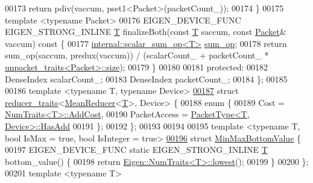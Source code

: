 \begin{DoxyCode}
00173     \textcolor{keywordflow}{return} pdiv(vaccum, pset1<Packet>(packetCount\_));
00174   \}
00175   \textcolor{keyword}{template} <\textcolor{keyword}{typename} Packet>
00176   EIGEN\_DEVICE\_FUNC EIGEN\_STRONG\_INLINE \hyperlink{group___sparse_core___module}{T} finalizeBoth(\textcolor{keyword}{const} \hyperlink{group___sparse_core___module}{T} saccum, \textcolor{keyword}{const} 
      \hyperlink{union_eigen_1_1internal_1_1_packet}{Packet}& vaccum)\textcolor{keyword}{ const }\{
00177     \hyperlink{struct_eigen_1_1internal_1_1scalar__sum__op}{internal::scalar\_sum\_op<T>} \hyperlink{struct_eigen_1_1internal_1_1sum__op}{sum\_op};
00178     \textcolor{keywordflow}{return} sum\_op(saccum, predux(vaccum)) / (scalarCount\_ + packetCount\_ * 
      \hyperlink{struct_eigen_1_1internal_1_1unpacket__traits}{unpacket\_traits<Packet>::size});
00179   \}
00180 
00181   \textcolor{keyword}{protected}:
00182     DenseIndex scalarCount\_;
00183     DenseIndex packetCount\_;
00184 \};
00185 
00186 \textcolor{keyword}{template} <\textcolor{keyword}{typename} T, \textcolor{keyword}{typename} Device>
\hyperlink{struct_eigen_1_1internal_1_1reducer__traits_3_01_mean_reducer_3_01_t_01_4_00_01_device_01_4}{00187} \textcolor{keyword}{struct }\hyperlink{struct_eigen_1_1internal_1_1reducer__traits}{reducer\_traits}<\hyperlink{struct_eigen_1_1internal_1_1_mean_reducer}{MeanReducer}<\hyperlink{group___sparse_core___module}{T}>, Device> \{
00188   \textcolor{keyword}{enum} \{
00189     Cost = \hyperlink{group___core___module_struct_eigen_1_1_num_traits}{NumTraits<T>::AddCost},
00190     PacketAccess = \hyperlink{struct_eigen_1_1_packet_type}{PacketType<T, Device>::HasAdd}
00191   \};
00192 \};
00193 
00194 
00195 \textcolor{keyword}{template} <\textcolor{keyword}{typename} T, \textcolor{keywordtype}{bool} IsMax = true, \textcolor{keywordtype}{bool} IsInteger = true>
\hyperlink{struct_eigen_1_1internal_1_1_min_max_bottom_value}{00196} \textcolor{keyword}{struct }\hyperlink{struct_eigen_1_1internal_1_1_min_max_bottom_value}{MinMaxBottomValue} \{
00197   EIGEN\_DEVICE\_FUNC \textcolor{keyword}{static} EIGEN\_STRONG\_INLINE \hyperlink{group___sparse_core___module}{T} bottom\_value() \{
00198     \textcolor{keywordflow}{return} \hyperlink{group___core___module_struct_eigen_1_1_num_traits}{Eigen::NumTraits<T>::lowest}();
00199   \}
00200 \};
00201 \textcolor{keyword}{template} <\textcolor{keyword}{typename} T>

\end{DoxyCode}

